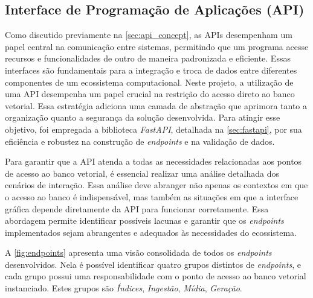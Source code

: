 \documentclass[a4paper, 12pt]{article}
\begin{document}
    \subsection{Interface de Programação de Aplicações (API)}\label{sec:api}

    Como discutido previamente na \autoref{sec:api_concept}, as APIs desempenham um papel central na comunicação entre sistemas, permitindo que um programa acesse recursos e funcionalidades de outro de maneira padronizada e eficiente. Essas interfaces são fundamentais para a integração e troca de dados entre diferentes componentes de um ecossistema computacional. Neste projeto, a utilização de uma API desempenha um papel crucial na restrição do acesso direto ao banco vetorial. Essa estratégia adiciona uma camada de abstração que aprimora tanto a organização quanto a segurança da solução desenvolvida. Para atingir esse objetivo, foi empregada a biblioteca \textit{FastAPI}, detalhada na \autoref{sec:fastapi}, por sua eficiência e robustez na construção de \textit{endpoints} e na validação de dados.
    
    Para garantir que a API atenda a todas as necessidades relacionadas aos pontos de acesso ao banco vetorial, é essencial realizar uma análise detalhada dos cenários de interação. Essa análise deve abranger não apenas os contextos em que o acesso ao banco é indispensável, mas também as situações em que a interface gráfica depende diretamente da API para funcionar corretamente. Essa abordagem permite identificar possíveis lacunas e garantir que os \textit{endpoints} implementados sejam abrangentes e adequados às necessidades do ecossistema. 
    
    A \autoref{fig:endpoints} apresenta uma visão consolidada de todos os \textit{endpoints} desenvolvidos. Nela é possível identificar quatro grupos distintos de \textit{endpoints}, e cada grupo possui uma responsabilidade com o ponto de acesso ao banco vetorial instanciado. Estes grupos são \textit{Índices}, \textit{Ingestão}, \textit{Mídia}, \textit{Geração}.
    
    \clearpage
\end{document}
